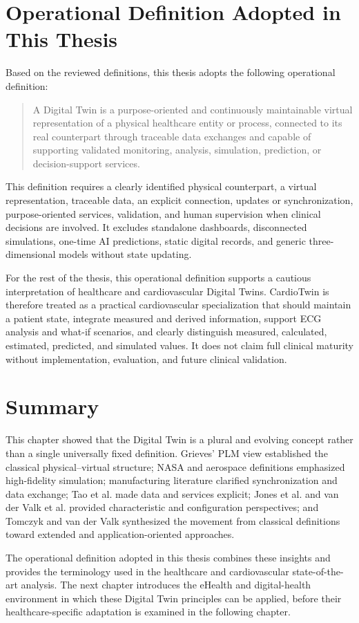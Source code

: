 \section{Operational Definition Adopted in This Thesis}
Based on the reviewed definitions, this thesis adopts the following operational definition:

\begin{quote}
A Digital Twin is a purpose-oriented and continuously maintainable virtual representation of a physical healthcare entity or process, connected to its real counterpart through traceable data exchanges and capable of supporting validated monitoring, analysis, simulation, prediction, or decision-support services.
\end{quote}

This definition requires a clearly identified physical counterpart, a virtual representation, traceable data, an explicit connection, updates or synchronization, purpose-oriented services, validation, and human supervision when clinical decisions are involved. It excludes standalone dashboards, disconnected simulations, one-time AI predictions, static digital records, and generic three-dimensional models without state updating.

For the rest of the thesis, this operational definition supports a cautious interpretation of healthcare and cardiovascular Digital Twins. CardioTwin is therefore treated as a practical cardiovascular specialization that should maintain a patient state, integrate measured and derived information, support ECG analysis and what-if scenarios, and clearly distinguish measured, calculated, estimated, predicted, and simulated values. It does not claim full clinical maturity without implementation, evaluation, and future clinical validation.

\section{Summary}
This chapter showed that the Digital Twin is a plural and evolving concept rather than a single universally fixed definition. Grieves' PLM view established the classical physical--virtual structure; NASA and aerospace definitions emphasized high-fidelity simulation; manufacturing literature clarified synchronization and data exchange; Tao et al. made data and services explicit; Jones et al. and van der Valk et al. provided characteristic and configuration perspectives; and Tomczyk and van der Valk synthesized the movement from classical definitions toward extended and application-oriented approaches.

The operational definition adopted in this thesis combines these insights and provides the terminology used in the healthcare and cardiovascular state-of-the-art analysis. The next chapter introduces the eHealth and digital-health environment in which these Digital Twin principles can be applied, before their healthcare-specific adaptation is examined in the following chapter.

\clearpage
